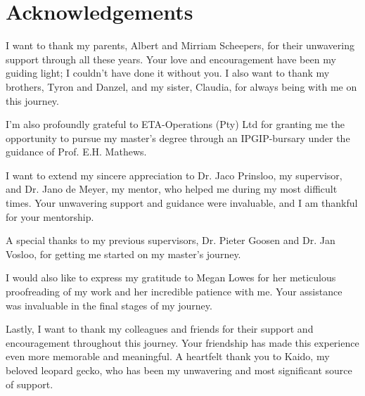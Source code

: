 
\cleardoublepage
{}
\chapter*{Acknowledgements}

I want to thank my parents, Albert and Mirriam Scheepers, for their unwavering support through all these years. Your love and encouragement have been my guiding light; I couldn't have done it without you. I also want to thank my brothers, Tyron and Danzel, and my sister, Claudia, for always being with me on this journey. \par I'm also profoundly grateful to ETA-Operations (Pty) Ltd for granting me the opportunity to pursue my master's degree through an IPGIP-bursary under the guidance of Prof. E.H. Mathews. \par I want to extend my sincere appreciation to Dr. Jaco Prinsloo, my supervisor, and Dr. Jano de Meyer, my mentor, who helped me during my most difficult times. Your unwavering support and guidance were invaluable, and I am thankful for your mentorship. \par A special thanks to my previous supervisors, Dr. Pieter Goosen and Dr. Jan Vosloo, for getting me started on my master's journey. \par I would also like to express my gratitude to Megan Lowes for her meticulous proofreading of my work and her incredible patience with me. Your assistance was invaluable in the final stages of my journey. \par Lastly, I want to thank my colleagues and friends for their support and encouragement throughout this journey. Your friendship has made this experience even more memorable and meaningful. A heartfelt thank you to Kaido, my beloved leopard gecko, who has been my unwavering and most significant source of support.